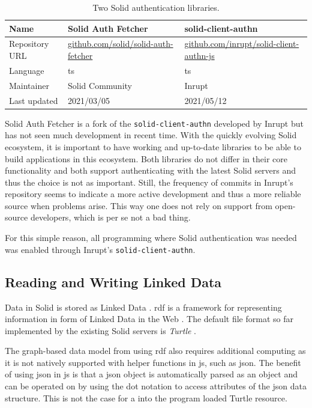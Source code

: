 \begin{table}[h!]
    \centering
    \begin{tabular}{| l | l | l |} 
     \hline
     Name & Solid Auth Fetcher & solid-client-authn \\
     \hline
     Repository URL & \url{github.com/solid/solid-auth-fetcher} & \url{github.com/inrupt/solid-client-authn-js} \\
     \hline
     Language & \gls{ts} & \gls{ts} \\
     \hline
     Maintainer & Solid Community & Inrupt \\
     \hline
     Last updated & 2021/03/05 & 2021/05/12 \\
     \hline
    \end{tabular}
    \vspace{0.75cm}
    \caption{Two Solid authentication libraries.}
    \label{table:0}
\end{table}

Solid Auth Fetcher is a fork of the \texttt{solid-client-authn} developed by Inrupt but has not seen much development in recent time. With the quickly evolving Solid ecosystem, it is important to have working and up-to-date libraries to be able to build applications in this ecosystem. Both libraries do not differ in their core functionality and both support authenticating with the latest Solid servers and thus the choice is not as important. Still, the frequency of commits in Inrupt's repository seems to indicate a more active development and thus a more reliable source when problems arise. This way one does not rely on support from open-source developers, which is per se not a bad thing.

For this simple reason, all programming where Solid authentication was needed was enabled through Inrupt's \texttt{solid-client-authn}.

\subsection{Reading and Writing Linked Data}

Data in Solid is stored as Linked Data \cite{Malhotra:15:LDP}. \gls{rdf} is a framework for representing information in form of Linked Data in the Web \cite{Cyganiak:14:RCA}. The default file format so far implemented by the existing Solid servers is \textit{Turtle} \cite{Prud:hommeaux:14:RT}.

The graph-based data model from using \gls{rdf} also requires additional computing as it is not natively supported with helper functions in \gls{js}, such as \gls{json}. The benefit of using \gls{json} in \gls{js} is that a \gls{json} object is automatically parsed as an object and can be operated on by using the dot notation to access attributes of the \gls{json} data structure. This is not the case for a into the program loaded Turtle resource.

